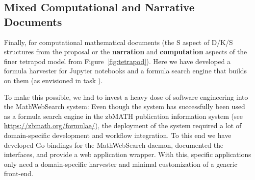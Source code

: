 \subsection{Mixed Computational and Narrative Documents}\label{subsec:software}
Finally, for computational mathematical documents (the S aspect of D/K/S structures from the \pn proposal or the \textbf{narration} and \textbf{computation} aspects of the finer tetrapod model from Figure~\ref{fig:tetrapod}).
Here we have developed a formula harvester for Jupyter notebooks and a formula search engine that builds on them (as envisioned in task ).

To make this possible, we had to invest a heavy dose of software engineering into the MathWebSearch system: Even though the system has successfully been used as a formula search engine in the zbMATH publication information system (see \url{https://zbmath.org/formulae/}), the deployment of the system required a lot of domain-specific development and workflow integration.
To this end we have developed Go bindings for the MathWebSearch daemon, documented the interfaces, and provide a web application wrapper.
With this, specific applications only need a domain-specific harvester and minimal customization of a generic front-end. 



